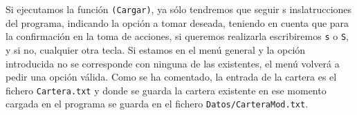 \documentclass[11pt,leqno]{article}
\theoremstyle{definition_wo_parentheses}
\theoremstyle{plain}
\theoremstyle{remark}
\begin{document}
Si ejecutamos la función \texttt{(Cargar)}, ya sólo tendremos que seguir s inslatrucciones del programa, indicando la opción a tomar deseada, teniendo en cuenta que para la confirmación en la toma de acciones, si queremos realizarla escribiremos \texttt{s} o \texttt{S}, y si no, cualquier otra tecla. Si estamos en el menú general y la opción introducida no se corresponde con ninguna de las existentes, el menú volverá a pedir una opción válida. Como se ha comentado, la entrada de la cartera es el fichero \texttt{Cartera.txt} y donde se guarda la cartera existente en ese momento cargada en el programa se guarda en el fichero \texttt{Datos/CarteraMod.txt}.
\end{document}
